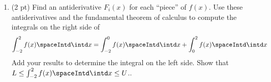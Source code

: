 


\begin{enumerate}[resume,label=(\alph*)]
\item\label{itm : RQ14Ac} (2 pt) Find an antiderivative $F_{i}(x)$ for each ``piece'' of $f(x)$. Use these antiderivatives and the fundamental theorem of calculus to compute the integrals on the right side of
\begin{align*}
\int_{-2}^{2} f(x) \spaceIntd \intd x
=
\int_{-2}^{0} f(x) \spaceIntd \intd x
+
\int_{0}^{2} f(x) \spaceIntd \intd x%
\label{eq : RQ14A Piecewise Integral}
\end{align*}
Add your results to determine the integral on the left side. Show that $L \leq \int_{-2}^{2} f(x) \spaceIntd \intd x \leq U$..
\end{enumerate}

\spaceSolution{1in}{%
}%